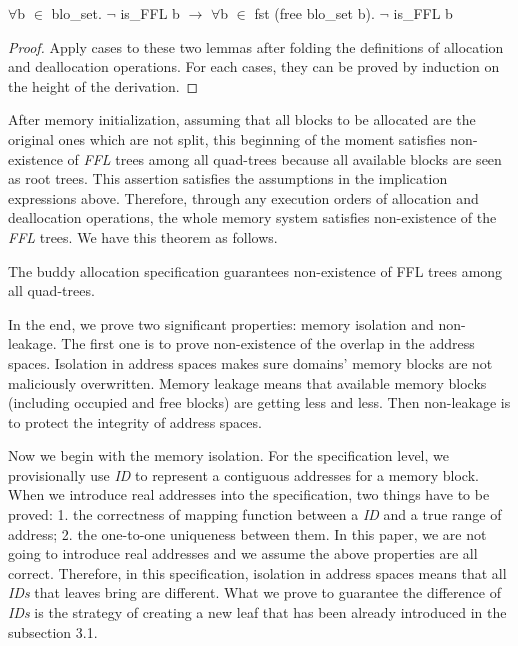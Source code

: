 \begin{lemma}
	$\forall$b $\in$ blo\_set. $\neg$ is\_FFL b $\longrightarrow$ $\forall$b $\in$ fst (free blo\_set b). $\neg$ is\_FFL b
\end{lemma}

\begin{proof}
	Apply cases to these two lemmas after folding the definitions of allocation and deallocation operations. For each cases, they can be proved by induction on the height of the derivation.
\end{proof}

After memory initialization, assuming that all blocks to be allocated are the original ones which are not split, this beginning of the moment satisfies non-existence of \emph{FFL} trees among all quad-trees because all available blocks are seen as root trees. This assertion satisfies the assumptions in the implication expressions above. Therefore, through any execution orders of allocation and deallocation operations, the whole memory system satisfies non-existence of the \emph{FFL} trees. We have this theorem as follows.

\begin{theorem}
	The buddy allocation specification guarantees non-existence of FFL trees among all quad-trees.
\end{theorem}

In the end, we prove two significant properties: memory isolation and non-leakage. The first one is to prove non-existence of the overlap in the address spaces. Isolation in address spaces makes sure domains' memory blocks are not maliciously overwritten. Memory leakage means that available memory blocks (including occupied and free blocks) are getting less and less. Then non-leakage is to protect the integrity of address spaces.

Now we begin with the memory isolation. For the specification level, we provisionally use \emph{ID} to represent a contiguous addresses for a memory block. When we introduce real addresses into the specification, two things have to be proved: 1. the correctness of mapping function between a \emph{ID} and a true range of address; 2. the one-to-one uniqueness between them. In this paper, we are not going to introduce real addresses and we assume the above properties are all correct. Therefore, in this specification, isolation in address spaces means that all \emph{IDs} that leaves bring are different. What we prove to guarantee the difference of \emph{IDs} is the strategy of creating a new leaf that has been already introduced in the subsection 3.1.

